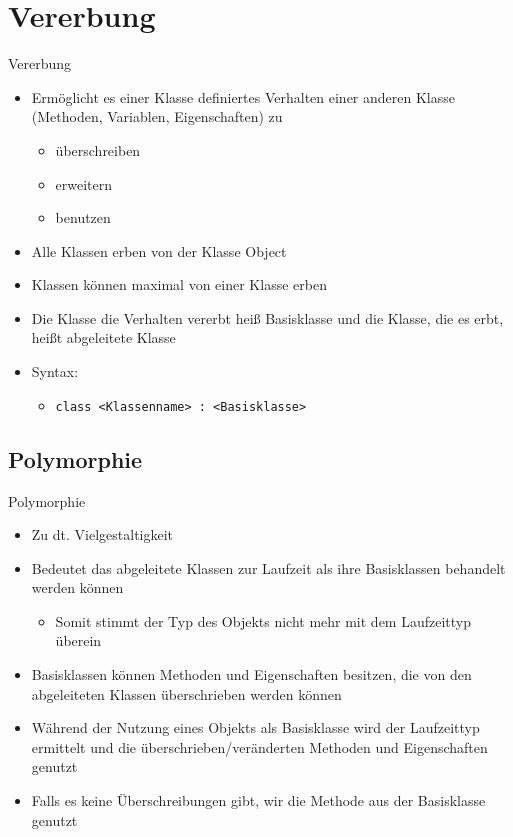 \section{Vererbung}
\begin{frame}{Vererbung}
	\begin{itemize}
		\item Ermöglicht es einer Klasse definiertes Verhalten einer anderen Klasse (Methoden, Variablen, Eigenschaften) zu
		\begin{itemize}
			\item überschreiben
			\item erweitern
			\item benutzen
		\end{itemize}
		\item Alle Klassen erben von der Klasse \alert{Object}
		\item Klassen können maximal von einer Klasse erben
		\item Die Klasse die Verhalten vererbt heiß \alert{Basisklasse} und die Klasse, die es erbt, heißt \alert{abgeleitete Klasse}
		\item Syntax:
		\begin{itemize}
			\item \texttt{class \alert{<Klassenname>} : \alert{<Basisklasse>}}
		\end{itemize}
	\end{itemize}
	
\end{frame}

\subsection{Polymorphie}
\begin{frame}{Polymorphie}
	\begin{itemize}
		\item Zu dt. Vielgestaltigkeit
		\item Bedeutet das abgeleitete Klassen zur Laufzeit als ihre Basisklassen behandelt werden können
		\begin{itemize}
			\item Somit stimmt der Typ des Objekts nicht mehr mit dem Laufzeittyp überein
		\end{itemize}
		\item Basisklassen können Methoden und Eigenschaften besitzen, die von den abgeleiteten Klassen überschrieben werden können
		\item Während der Nutzung eines Objekts als Basisklasse wird der Laufzeittyp ermittelt und die überschrieben/veränderten Methoden und Eigenschaften genutzt
		\item Falls es keine Überschreibungen gibt, wir die Methode aus der Basisklasse genutzt
	\end{itemize} 
\end{frame}

